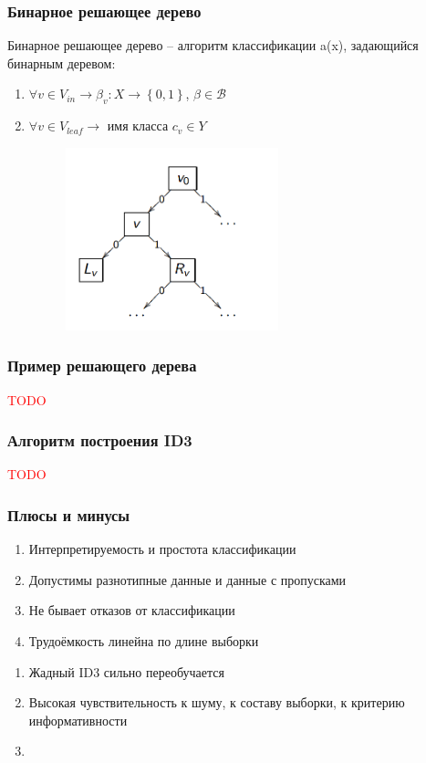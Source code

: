 \documentclass[12pt]{beamer}
\begin{document}
\begin{frame}\frametitle{Бинарное решающее дерево}
Бинарное решающее дерево -- алгоритм классификации a(x), задающийся бинарным деревом:\\
\begin{enumerate}[--]
\item $\forall v \in V_{in} \rightarrow \beta_v: X \rightarrow \left\{ 0,1\right\}$, $\beta \in \mathcal{B}$
\item $\forall v \in V_{leaf} \rightarrow $ имя класса $c_v \in Y$\\

\begin{figure}[htbp]
  \includegraphics[height=150pt, keepaspectratio = true]{images/binary_tree}   
\end{figure}
\end{enumerate}
\end{frame}

\begin{frame}\frametitle{Пример решающего дерева}
\textcolor{red}{TODO}
\end{frame}

\begin{frame}\frametitle{Алгоритм построения ID3}
\textcolor{red}{TODO}
\end{frame}

\begin{frame}\frametitle{Плюсы и минусы}
\begin{enumerate}[+]
\item Интерпретируемость и простота классификации
\item Допустимы разнотипные данные и данные с пропусками
\item Не бывает отказов от классификации
\item Трудоёмкость линейна по длине выборки
\end{enumerate}
\begin{enumerate}[-]
\item Жадный ID3 сильно переобучается
\item Высокая чувствительность к шуму, к составу выборки, к критерию информативности
\item 
\end{enumerate}
\end{frame}
\end{document}
